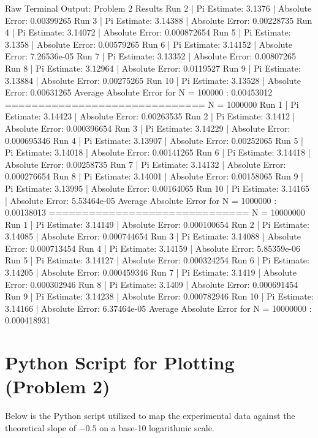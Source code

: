 \documentclass{article}
\begin{document}
\begin{outputbox}{Raw Terminal Output: Problem 2 Results}
Run 2 | Pi Estimate: 3.1376 | Absolute Error: 0.00399265
Run 3 | Pi Estimate: 3.14388 | Absolute Error: 0.00228735
Run 4 | Pi Estimate: 3.14072 | Absolute Error: 0.000872654
Run 5 | Pi Estimate: 3.1358 | Absolute Error: 0.00579265
Run 6 | Pi Estimate: 3.14152 | Absolute Error: 7.26536e-05
Run 7 | Pi Estimate: 3.13352 | Absolute Error: 0.00807265
Run 8 | Pi Estimate: 3.12964 | Absolute Error: 0.0119527
Run 9 | Pi Estimate: 3.13884 | Absolute Error: 0.00275265
Run 10 | Pi Estimate: 3.13528 | Absolute Error: 0.00631265
Average Absolute Error for N = 100000 : 0.00453012
==============================
N = 1000000
Run 1 | Pi Estimate: 3.14423 | Absolute Error: 0.00263535
Run 2 | Pi Estimate: 3.1412 | Absolute Error: 0.000396654
Run 3 | Pi Estimate: 3.14229 | Absolute Error: 0.000695346
Run 4 | Pi Estimate: 3.13907 | Absolute Error: 0.00252065
Run 5 | Pi Estimate: 3.14018 | Absolute Error: 0.00141265
Run 6 | Pi Estimate: 3.14418 | Absolute Error: 0.00258735
Run 7 | Pi Estimate: 3.14132 | Absolute Error: 0.000276654
Run 8 | Pi Estimate: 3.14001 | Absolute Error: 0.00158065
Run 9 | Pi Estimate: 3.13995 | Absolute Error: 0.00164065
Run 10 | Pi Estimate: 3.14165 | Absolute Error: 5.53464e-05
Average Absolute Error for N = 1000000 : 0.00138013
==============================
N = 10000000
Run 1 | Pi Estimate: 3.14149 | Absolute Error: 0.000100654
Run 2 | Pi Estimate: 3.14085 | Absolute Error: 0.000744654
Run 3 | Pi Estimate: 3.14088 | Absolute Error: 0.000713454
Run 4 | Pi Estimate: 3.14159 | Absolute Error: 5.85359e-06
Run 5 | Pi Estimate: 3.14127 | Absolute Error: 0.000324254
Run 6 | Pi Estimate: 3.14205 | Absolute Error: 0.000459346
Run 7 | Pi Estimate: 3.1419 | Absolute Error: 0.000302946
Run 8 | Pi Estimate: 3.1409 | Absolute Error: 0.000691454
Run 9 | Pi Estimate: 3.14238 | Absolute Error: 0.000782946
Run 10 | Pi Estimate: 3.14166 | Absolute Error: 6.37464e-05
Average Absolute Error for N = 10000000 : 0.000418931
\end{outputbox}

\newpage    

\section{Python Script for Plotting (Problem 2)}
Below is the Python script utilized to map the experimental data against the theoretical slope of $-0.5$ on a base-10 logarithmic scale.
\end{document}
